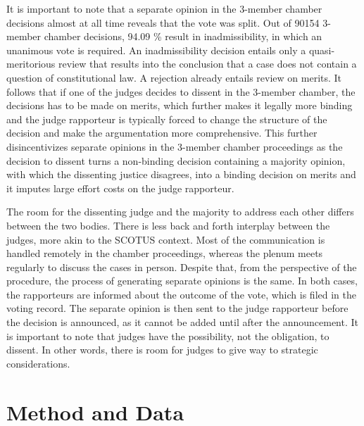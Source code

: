 \documentclass[
  11pt,
]{article}
\begin{document}
It is important to note that a separate opinion in the 3-member chamber decisions almost at all time reveals that the vote was split. Out of 90154 3-member chamber decisions, 94.09 \% result in inadmissibility, in which an unanimous vote is required. An inadmissibility decision entails only a quasi-meritorious review that results into the conclusion that a case does not contain a question of constitutional law. A rejection already entails review on merits. It follows that if one of the judges decides to dissent in the 3-member chamber, the decisions has to be made on merits, which further makes it legally more binding and the judge rapporteur is typically forced to change the structure of the decision and make the argumentation more comprehensive. This further disincentivizes separate opinions in the 3-member chamber proceedings as the decision to dissent turns a non-binding decision containing a majority opinion, with which the dissenting justice disagrees, into a binding decision on merits and it imputes large effort costs on the judge rapporteur.

The room for the dissenting judge and the majority to address each other differs between the two bodies. There is less back and forth interplay between the judges, more akin to the SCOTUS context. Most of the communication is handled remotely in the chamber proceedings, whereas the plenum meets regularly to discuss the cases in person. Despite that, from the perspective of the procedure, the process of generating separate opinions is the same. In both cases, the rapporteurs are informed about the outcome of the vote, which is filed in the voting record. The separate opinion is then sent to the judge rapporteur before the decision is announced, as it cannot be added until after the announcement. It is important to note that judges have the possibility, not the obligation, to dissent. In other words, there is room for judges to give way to strategic considerations.

\section{Method and Data}\label{method}
\end{document}
